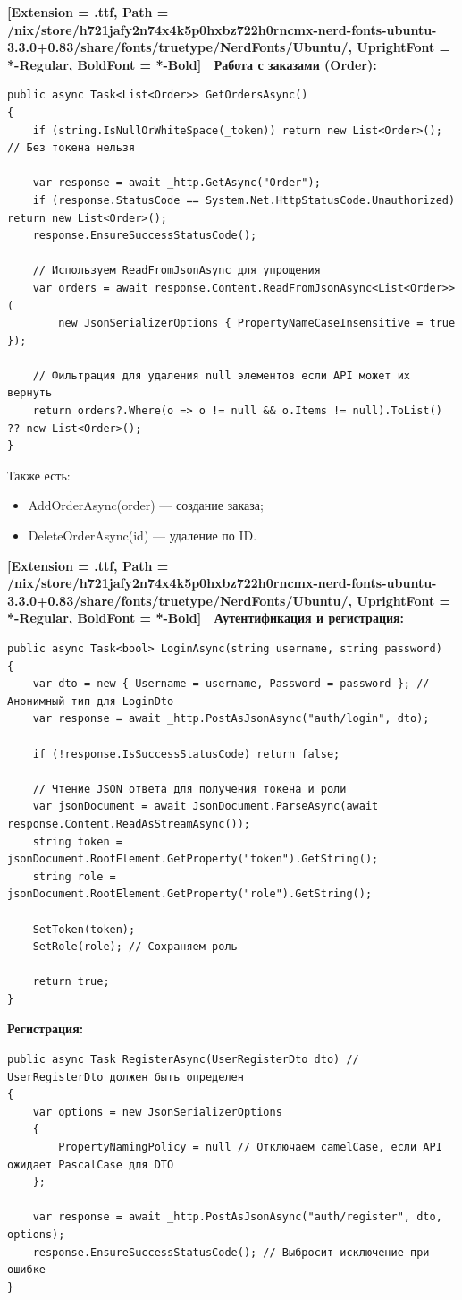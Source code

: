 \documentclass[12pt]{article}
\newcommand{\icon}[1]{\fontspec{UbuntuNerdFont}[Extension = .ttf,
  Path = /nix/store/h721jafy2n74x4k5p0hxbz722h0rncmx-nerd-fonts-ubuntu-3.3.0+0.83/share/fonts/truetype/NerdFonts/Ubuntu/,
  UprightFont = *-Regular,
BoldFont = *-Bold] #1}
\newcommand{\iicon}[1]{{\icon{#1}}}
\renewcommand{\texttt}[1]{{\small\ttfamily #1}}
\numberwithin{listing}{section}
\numberwithin{figure}{section}
\begin{document}
\noindent \textbf{\iicon{󰄑} Работа с заказами (Order):}
\begin{verbatim}
public async Task<List<Order>> GetOrdersAsync()
{
    if (string.IsNullOrWhiteSpace(_token)) return new List<Order>(); // Без токена нельзя

    var response = await _http.GetAsync("Order");
    if (response.StatusCode == System.Net.HttpStatusCode.Unauthorized) return new List<Order>();
    response.EnsureSuccessStatusCode();

    // Используем ReadFromJsonAsync для упрощения
    var orders = await response.Content.ReadFromJsonAsync<List<Order>>(
        new JsonSerializerOptions { PropertyNameCaseInsensitive = true });
    
    // Фильтрация для удаления null элементов если API может их вернуть
    return orders?.Where(o => o != null && o.Items != null).ToList() ?? new List<Order>();
}
\end{verbatim}
Также есть:
\begin{itemize}
	\item \texttt{AddOrderAsync(order)} — создание заказа;
	\item \texttt{DeleteOrderAsync(id)} — удаление по ID.
\end{itemize}

\noindent \textbf{\iicon{} Аутентификация и регистрация:}
\begin{verbatim}
public async Task<bool> LoginAsync(string username, string password)
{
    var dto = new { Username = username, Password = password }; // Анонимный тип для LoginDto
    var response = await _http.PostAsJsonAsync("auth/login", dto);

    if (!response.IsSuccessStatusCode) return false;

    // Чтение JSON ответа для получения токена и роли
    var jsonDocument = await JsonDocument.ParseAsync(await response.Content.ReadAsStreamAsync());
    string token = jsonDocument.RootElement.GetProperty("token").GetString();
    string role = jsonDocument.RootElement.GetProperty("role").GetString();

    SetToken(token);
    SetRole(role); // Сохраняем роль

    return true;
}
\end{verbatim}
\textbf{Регистрация:}
\begin{verbatim}
public async Task RegisterAsync(UserRegisterDto dto) // UserRegisterDto должен быть определен
{
    var options = new JsonSerializerOptions
    {
        PropertyNamingPolicy = null // Отключаем camelCase, если API ожидает PascalCase для DTO
    };

    var response = await _http.PostAsJsonAsync("auth/register", dto, options);
    response.EnsureSuccessStatusCode(); // Выбросит исключение при ошибке
}
\end{verbatim}
\end{document}
